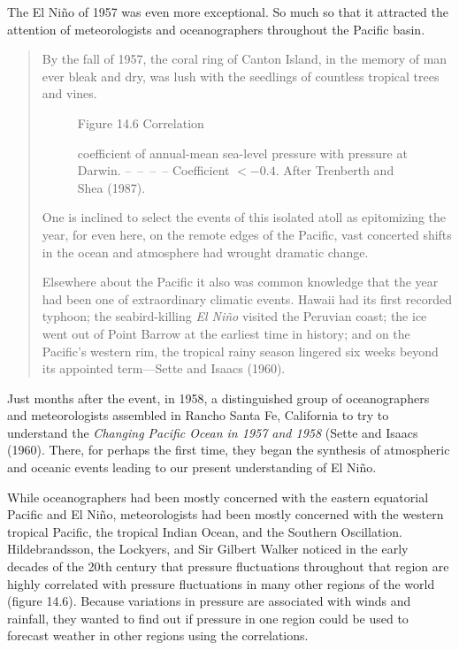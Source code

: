 The El Ni\~{n}o of 1957 was even more exceptional. So much so that it
attracted the attention of meteorologists and oceanographers
throughout the Pacific basin.
\begin{quotation} \small
By the fall of 1957, the coral ring of Canton Island, in the memory of
man ever bleak and dry, was lush with the seedlings of countless
tropical trees and vines.

\begin{figure}[b!]
\vspace{-1ex}
\centering
{}
\footnotesize
Figure 14.6 Correlation \rule{0pt}{3ex}coefficient of annual-mean
sea-level pressure with pressure at Darwin. --\ --\ --\ -- Coefficient
$< -0.4$. After Trenberth and Shea (1987).

\label{fig:ensocorrelations}
\end{figure}
One is inclined to select the events of this isolated atoll as
epitomizing the year, for even here, on the remote edges of the
Pacific, vast concerted shifts in the ocean and atmosphere had wrought
dramatic change.

Elsewhere about the Pacific it also was common knowledge that the year
had been one of extraordinary climatic events. Hawaii had its first
recorded typhoon; the seabird-killing \textit{El Ni\~{n}o} visited the
Peruvian coast; the ice went out of Point Barrow at the earliest time
in history; and on the Pacific's western rim, the tropical rainy
season lingered six weeks beyond its appointed term---Sette and Isaacs
(1960).
\end{quotation}

Just months after the event, in 1958, a distinguished group of
oceanographers and meteorologists assembled in Rancho Santa Fe,
California to try to understand the \textit{Changing Pacific Ocean in
  1957 and 1958} (Sette and Isaacs (1960). There, for perhaps the
first time, they began the synthesis of atmospheric and oceanic events
leading to our present understanding of El Ni\~{n}o.

While oceanographers had been mostly concerned with the eastern
equatorial Pacific and El Ni\~{n}o, meteorologists had been mostly
concerned with the western tropical Pacific, the tropical Indian
Ocean, and the Southern Oscillation. Hildebrandsson, the Lockyers, and Sir Gilbert Walker
noticed in the early decades of the 20th century that pressure
fluctuations throughout that region are highly correlated with
pressure fluctuations in many other regions of the world (figure
14.6). Because variations in pressure are associated with winds and
rainfall, they wanted to find out if pressure in one region could be
used to forecast weather in other regions using the correlations.

